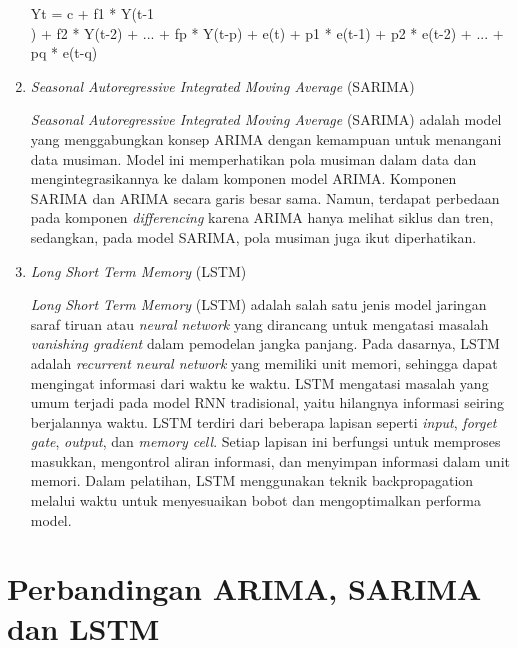 \begin{enumerate}
    Yt = c + f1 * Y(t-1\\) + f2 * Y(t-2) + ... + fp * Y(t-p) + e(t) + p1 * e(t-1) + p2 * e(t-2) + ... + pq * e(t-q)

    \item \textit{Seasonal Autoregressive Integrated Moving Average} (SARIMA)
    
    \textit{Seasonal Autoregressive Integrated Moving Average} (SARIMA) adalah model yang menggabungkan konsep ARIMA dengan kemampuan untuk menangani data musiman. Model ini memperhatikan pola musiman dalam data dan mengintegrasikannya ke dalam komponen model ARIMA. Komponen SARIMA dan ARIMA secara garis besar sama. Namun, terdapat perbedaan pada komponen \textit{differencing} karena ARIMA hanya melihat siklus dan tren, sedangkan, pada model SARIMA, pola musiman juga ikut diperhatikan.

    \item \textit{Long Short Term Memory} (LSTM)
    
    \textit{Long Short Term Memory} (LSTM) adalah salah satu jenis model jaringan saraf tiruan atau \textit{neural network} yang dirancang untuk mengatasi masalah \textit{vanishing gradient} dalam pemodelan jangka panjang. Pada dasarnya, LSTM adalah \textit{recurrent neural network} yang memiliki unit memori, sehingga dapat mengingat informasi dari waktu ke waktu. LSTM mengatasi masalah yang umum terjadi pada model RNN tradisional, yaitu hilangnya informasi seiring berjalannya waktu. LSTM terdiri dari beberapa lapisan seperti \textit{input}, \textit{forget gate}, \textit{output}, dan \textit{memory cell}. Setiap lapisan ini berfungsi untuk memproses masukkan, mengontrol aliran informasi, dan menyimpan informasi dalam unit memori. Dalam pelatihan, LSTM menggunakan teknik backpropagation melalui waktu untuk menyesuaikan bobot dan mengoptimalkan performa model. 

\end{enumerate}

\section{Perbandingan ARIMA, SARIMA dan LSTM}


